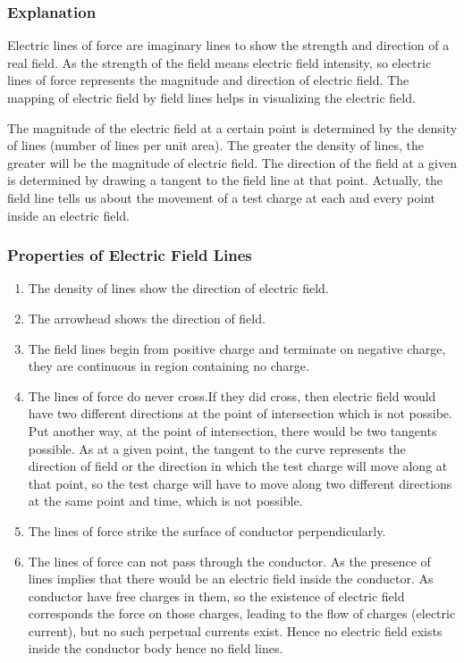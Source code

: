 \subsubsection{Explanation}
Electric lines of force are imaginary lines to show the strength
and direction of a real field. As the strength of the field means
electric field intensity, so electric lines of force represents the
magnitude and direction of electric field. The mapping of electric
field by field lines helps in visualizing the electric field.

The magnitude of the electric field at a certain point is
determined by the density of lines (number of lines per unit area).
The greater the density of lines, the greater will be the magnitude
of electric field. The direction of the field at a given is determined
by drawing a tangent to the field line at that point. Actually,
the field line tells us about the movement of a test charge at
each and every point inside an electric field.
\subsubsection{Properties of Electric Field Lines}
\begin{enumerate}[label=(\roman*)]
\item The density of lines show the direction of electric field.
\item The arrowhead shows the direction of field.
\item The field lines begin from positive charge and terminate on negative
charge, they are continuous in region containing no charge.
\item The lines of force do never cross.If they did cross,
then electric field would have two different directions at
the point of intersection which is not possibe.
Put another way, at the point of intersection,
there would be two tangents possible. As at a given point,
the tangent to the curve represents the direction of field or
the direction in which the test charge will move along at that point,
so the test charge will have to move along two different directions
at the same point and time, which is not possible.
\item The lines of force strike the surface of conductor perpendicularly.
\item The lines of force can not pass through the conductor. As the 
presence of lines implies that there would be an electric field
inside the conductor. As conductor have free charges in them,
so the existence of electric field corresponds the force on those charges,
leading to the flow of charges (electric current),
but no such perpetual currents exist. Hence no electric field exists
inside the conductor body hence no field lines.
\end{enumerate}
